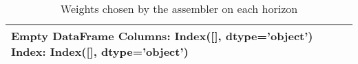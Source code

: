 \begin{table}
\centering
\caption{Weights chosen by the assembler on each horizon}
\label{tab:weights_assembler}
\begin{tabular}{l}
\toprule
Empty DataFrame
Columns: Index([], dtype='object')
Index: Index([], dtype='object') \\
\bottomrule
\end{tabular}
\end{table}
